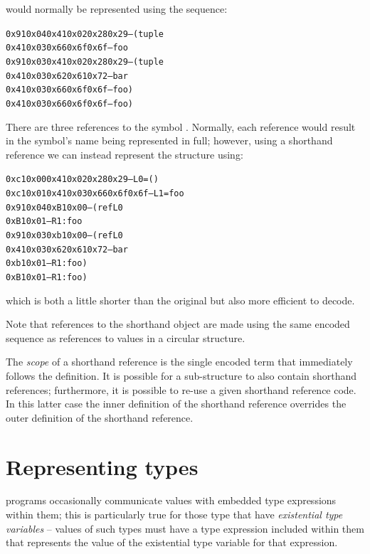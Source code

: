 would normally be represented using the sequence:

\begin{alltt}
0x91 0x04 0x41 0x02 0x28 0x29             -- ( tuple
     0x41 0x03 0x66 0x6f 0x6f             -- foo
     0x91 0x03 0x41 0x02 0x28 0x29        -- (tuple
               0x41 0x03 0x62 0x61 0x72   --  bar
               0x41 0x03 0x66 0x6f 0x6f   -- foo )
     0x41 0x03 0x66 0x6f 0x6f             -- foo)
\end{alltt}

There are three references to the symbol . Normally, each reference would result in the symbol's name being represented in full; however, using a shorthand reference we can instead represent the structure using:

\begin{alltt}
0xc1 0x00 0x41 0x02 0x28 0x29             -- L0=()
0xc1 0x01 0x41 0x03 0x66 0x6f 0x6f        -- L1=foo
     0x91 0x04 0xB1 0x00                  -- ( ref L0
          0xB1 0x01                       -- R1:foo
          0x91 0x03 0xb1 0x00             -- ( ref L0
                    0x41 0x03 0x62 0x61 0x72   --  bar
                    0xb1 0x01              -- R1:foo )
      0xB1 0x01                            -- R1:foo)

\end{alltt}
which is both a little shorter than the original but also more efficient to decode.

Note that references to the shorthand object are made using the same encoded sequence as references to values in a circular structure. 

The \emph{scope} of a shorthand reference is the single encoded term that immediately follows the definition. It is possible for a sub-structure to also contain shorthand references; furthermore, it is possible to re-use a given shorthand reference code. In this latter case the inner definition of the shorthand reference overrides the outer definition of the shorthand reference.

\section{Representing types}
\label{encoded:types}

\go programs occasionally communicate values with embedded type expressions within them; this is particularly true for those type that have \emph{existential type variables} -- values of such types must have a type expression included within them that represents the value of the existential type variable for that expression.

